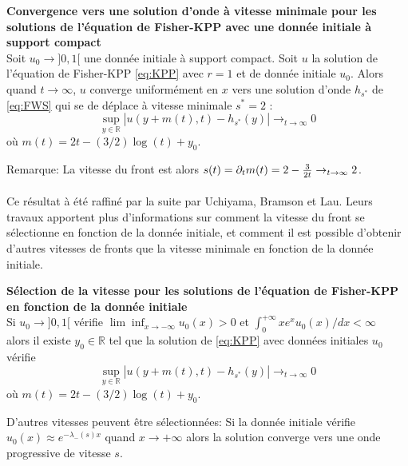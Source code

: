 \begin{theorem}{\textbf{Convergence vers une solution d'onde à vitesse minimale pour les solutions de l'équation de Fisher-KPP avec une donnée initiale à support compact }}\\
Soit $u_0 \to ]0,1[$ une donnée initiale à support compact. 
Soit $u$ la solution de l'équation de Fisher-KPP \eqref{eq:KPP} avec $r=1$ et de donnée initiale $u_0$.
Alors quand $t \to \infty$, $u$ converge uniformément en $x$ vers une solution d'onde $h_{s^*}$ de \eqref{eq:FWS} qui se de déplace à vitesse minimale $s^* =2$ :
\begin{equation*}
\sup_{y \in \mathbb{R}}  |u(y+m(t),t)-h_{s^*}(y)| \to_{t\to \infty} 0
\end{equation*}
où $m(t)= 2t - (3/2)\log (t) + y_0 $.
\end{theorem}
Remarque: La vitesse du front est alors $s(t) = \partial_t m(t) = 2 - \frac{3}{2t} \to_{t\to \infty} 2 $.
\paragraph{}
Ce résultat à été raffiné par la suite par Uchiyama, Bramson et Lau. Leurs travaux apportent plus d'informations sur comment la vitesse du front se sélectionne en fonction de la donnée initiale, et comment il est possible d'obtenir d'autres vitesses de fronts que la vitesse minimale en fonction de la donnée initiale.
\begin{theorem}{\textbf{Sélection de la vitesse pour les solutions de l'équation de Fisher-KPP en fonction de la donnée initiale}}\\
Si $u_0 \to ]0,1[$ vérifie $\lim\inf_{x\to -\infty} u_0(x) > 0$ et $\int_0^{+\infty} xe^xu_0(x) / dx < \infty$\\
alors il existe $y_0 \in \mathbb{R}$ tel que la solution de \eqref{eq:KPP} avec données initiales $u_0$ vérifie
\begin{equation*}
\sup_{y \in \mathbb{R}}  |u(y+m(t),t)-h_{s^*}(y)| \to_{t\to \infty} 0
\end{equation*}
où $m(t)= 2t - (3/2)\log (t) + y_0 $. 
\end{theorem}
D'autres vitesses peuvent être sélectionnées: Si la donnée initiale vérifie $u_0(x) \approx  e^{-\lambda_-(s)x}$ quand $x \to +\infty$ alors la solution converge vers une onde progressive de vitesse $s$.





\newpage
